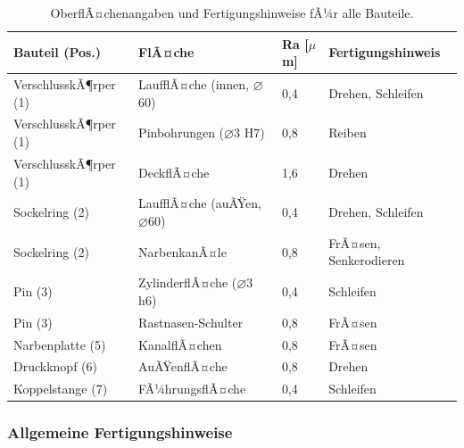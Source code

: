 ﻿\documentclass[12pt, a4paper]{article}
\theoremstyle{remark}
\begin{document}
\begin{table}[H]
  \centering
  \caption{OberflÃ¤chenangaben und Fertigungshinweise fÃ¼r alle Bauteile.}
  \label{tab:oberflaechen}
  \renewcommand{\arraystretch}{1.35}
  \begin{tabular}{llll}
    \toprule
    \textbf{Bauteil (Pos.)} & \textbf{FlÃ¤che} & \textbf{Ra [$\mu$m]} & \textbf{Fertigungshinweis} \\
    \midrule
    VerschlusskÃ¶rper (1)  & LaufflÃ¤che (innen, $\varnothing$60)  & 0{,}4 & Drehen, Schleifen \\
    VerschlusskÃ¶rper (1)  & Pinbohrungen ($\varnothing$3 H7)     & 0{,}8 & Reiben \\
    VerschlusskÃ¶rper (1)  & DeckflÃ¤che                           & 1{,}6 & Drehen \\
    Sockelring (2)        & LaufflÃ¤che (auÃŸen, $\varnothing$60)  & 0{,}4 & Drehen, Schleifen \\
    Sockelring (2)        & NarbenkanÃ¤le                         & 0{,}8 & FrÃ¤sen, Senkerodieren \\
    Pin (3)               & ZylinderflÃ¤che ($\varnothing$3 h6)   & 0{,}4 & Schleifen \\
    Pin (3)               & Rastnasen-Schulter                   & 0{,}8 & FrÃ¤sen \\
    Narbenplatte (5)      & KanalflÃ¤chen                         & 0{,}8 & FrÃ¤sen \\
    Druckknopf (6)        & AuÃŸenflÃ¤che                          & 0{,}8 & Drehen \\
    Koppelstange (7)      & FÃ¼hrungsflÃ¤che                       & 0{,}4 & Schleifen \\
    \bottomrule
  \end{tabular}
\end{table}

\subsubsection*{Allgemeine Fertigungshinweise}
\end{document}
